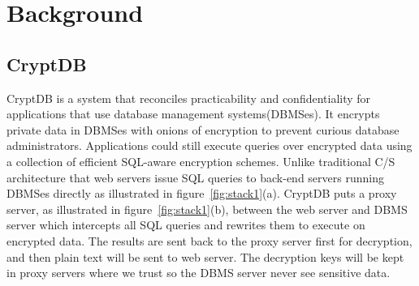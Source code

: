 \section{Background}

\subsection{CryptDB}

CryptDB is a system that reconciles practicability and confidentiality for applications that use database management systems(DBMSes).
It encrypts private data in DBMSes with onions of encryption to prevent curious database administrators. 
Applications could still execute queries over encrypted data using a collection of efficient SQL-aware encryption schemes. 
Unlike traditional C/S architecture that web servers issue SQL queries to back-end servers running DBMSes directly as illustrated in figure~\ref{fig:stack1}(a). 
CryptDB puts a proxy server, as illustrated in figure~\ref{fig:stack1}(b), between the web server and DBMS server which intercepts all SQL queries and rewrites them to execute on encrypted data. 
The results are sent back to the proxy server first for decryption, and then plain text will be sent to web server. 
The decryption keys will be kept in proxy servers where we trust so the DBMS server never see sensitive data.





